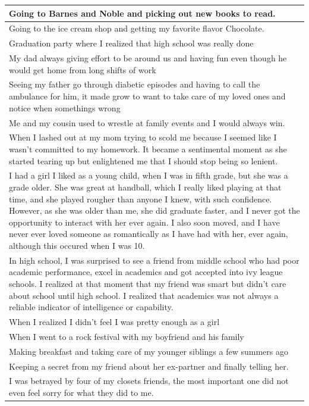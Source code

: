 \documentclass[
  .7em,
  letterpaper,
  DIV=11,
  numbers=noendperiod]{scrartcl}
\begin{document}
\begin{table}
\begin{tabular}{l}
\hline
Going to Barnes and Noble and picking out new books to read.\\
\hline
Going to the ice cream shop and getting my favorite flavor Chocolate.\\
\hline
Graduation party where I realized that high school was really done\\
\hline
My dad always giving effort to be around us and having fun even though he would get home from long shifts of work\\
\hline
Seeing my father go through diabetic episodes and having to call the ambulance for him, it made grow to want to take care of my loved ones and notice when somethings wrong\\
\hline
Me and my cousin used to wrestle at family events and I would always win.\\
\hline
When I lashed out at my mom trying to scold me because I seemed like I wasn't committed to my homework. It became a sentimental moment as she started tearing up but enlightened me that I should stop being so lenient.\\
\hline
I had a girl I liked as a young child, when I was in fifth grade, but she was a grade older. She was great at handball, which I really liked playing at that time, and she played rougher than anyone I knew, with such confidence. However, as she was older than me, she did graduate faster, and I never got the opportunity to interact with her ever again. I also soon moved, and I have never ever loved someone as romantically as I have had with her, ever again, although this occured when I was 10.\\
\hline
In high school, I was surprised to see a friend from middle school who had poor academic performance, excel in academics and got accepted into ivy league schools. I realized at that moment that my friend was smart but didn't care about school until high school. I realized that academics was not always a reliable indicator of intelligence or capability.\\
\hline
When I realized I didn’t feel I was pretty enough as a girl\\
\hline
When I went to a rock festival with my boyfriend and his family\\
\hline
Making breakfast and taking care of my younger siblings a few summers ago\\
\hline
Keeping a secret from my friend about her ex-partner and finally telling her.\\
\hline
I was betrayed by four of my closets friends, the most important one did not even feel sorry for what they did to me.\\

\end{tabular}
\end{table}
\end{document}
